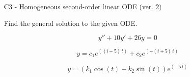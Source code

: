 \begin{exercise}
  \begin{exerciseTitle}C3 - Homogeneous second-order linear ODE (ver. 2)\end{exerciseTitle}
  \begin{exerciseStatement}
    
Find the general solution to the given ODE.

    
\[y''+10y'+26y = 0\]

  \end{exerciseStatement}
  \begin{exerciseAnswer}
    
\[y= c_{1} e^{\left(\left(i - 5\right) \, t\right)} + c_{2} e^{\left(-\left(i + 5\right) \, t\right)}\]

    
\[y= {\left(k_{1} \cos\left(t\right) + k_{2} \sin\left(t\right)\right)} e^{\left(-5 \, t\right)}\]

  \end{exerciseAnswer}
\end{exercise}